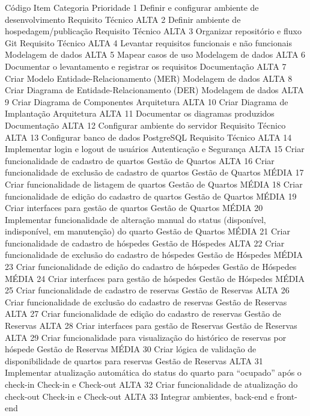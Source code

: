 Código
	Item
	Categoria
	Prioridade
	1
	Definir e configurar ambiente de desenvolvimento
	Requisito Técnico
	ALTA
	2
	Definir ambiente de hospedagem/publicação
	Requisito Técnico
	ALTA
	3
	Organizar repositório e fluxo Git
	Requisito Técnico
	ALTA
	4
	Levantar requisitos funcionais e não funcionais
	Modelagem de dados
	ALTA
	5
	Mapear casos de uso
	Modelagem de dados
	ALTA
	6
	Documentar o levantamento e registrar os requisitos
	Documentação
	ALTA
	7
	Criar Modelo Entidade-Relacionamento (MER)
	Modelagem de dados
	ALTA
	8
	Criar Diagrama de Entidade-Relacionamento (DER)
	Modelagem de dados
	ALTA
	9
	Criar Diagrama de Componentes
	Arquitetura
	ALTA
	10
	Criar Diagrama de Implantação
	Arquitetura
	ALTA
	11
	Documentar os diagramas produzidos
	Documentação
	ALTA
	12
	Configurar ambiente do servidor
	Requisito Técnico
	ALTA
	13
	Configurar banco de dados PostgreSQL
	Requisito Técnico
	ALTA
	14
	Implementar login e logout de usuários
	Autenticação e Segurança
	ALTA
	15
	Criar funcionalidade de cadastro de quartos
	Gestão de Quartos
	ALTA
	16
	Criar funcionalidade de exclusão de cadastro de quartos
	Gestão de Quartos
	MÉDIA
	17
	Criar funcionalidade de listagem de quartos
	Gestão de Quartos
	MÉDIA
	18
	Criar funcionalidade de edição do cadastro de quartos
	Gestão de Quartos
	MÉDIA
	19
	Criar interfaces para gestão de quartos
	Gestão de Quartos
	MÉDIA
	20
	Implementar funcionalidade de alteração manual do status (disponível, indisponível, em manutenção) do quarto
	Gestão de Quartos
	MÉDIA
	21
	Criar funcionalidade de cadastro de hóspedes
	Gestão de Hóspedes
	ALTA
	22
	Criar funcionalidade de exclusão do cadastro de hóspedes
	Gestão de Hóspedes
	MÉDIA
	23
	Criar funcionalidade de edição do cadastro de hóspedes
	Gestão de Hóspedes
	MÉDIA
	24
	Criar interfaces para gestão de hóspedes
	Gestão de Hóspedes
	MÉDIA
	25
	Criar funcionalidade de cadastro de reservas
	Gestão de Reservas
	ALTA
	26
	Criar funcionalidade de exclusão do cadastro de reservas
	Gestão de Reservas
	ALTA
	27
	Criar funcionalidade de edição do cadastro de reservas
	Gestão de Reservas
	ALTA
	28
	Criar interfaces para gestão de Reservas
	Gestão de Reservas
	ALTA
	29
	Criar funcionalidade para visualização do histórico de reservas por hóspede
	Gestão de Reservas
	MÉDIA
	30
	Criar lógica de validação de disponibilidade de quartos para reservas
	Gestão de Reservas
	ALTA
	31
	Implementar atualização automática do status do quarto para “ocupado” após o check-in
	Check-in e Check-out
	ALTA
	32
	Criar funcionalidade de atualização do check-out
	Check-in e Check-out
	ALTA
	33
	Integrar ambientes, back-end e front-end
